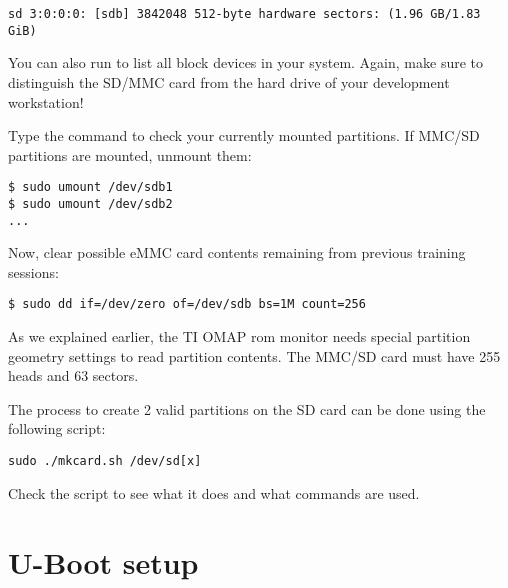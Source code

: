 \begin{verbatim}
sd 3:0:0:0: [sdb] 3842048 512-byte hardware sectors: (1.96 GB/1.83 GiB)
\end{verbatim}


You can also run  to list all block devices
in your system. Again, make sure to distinguish the SD/MMC card from the
hard drive of your development workstation!

Type the  command to check your currently mounted
partitions. If MMC/SD partitions are mounted, unmount them:

\begin{verbatim}
$ sudo umount /dev/sdb1
$ sudo umount /dev/sdb2
...
\end{verbatim}

Now, clear possible eMMC card contents remaining from previous training
sessions:

\begin{verbatim}
$ sudo dd if=/dev/zero of=/dev/sdb bs=1M count=256
\end{verbatim}

As we explained earlier, the TI OMAP rom monitor needs special partition geometry settings
to read partition contents. The MMC/SD card must have 255 heads and 63 sectors.

The process to create 2 valid partitions on the SD card can be done using the following script:
\begin{verbatim}
sudo ./mkcard.sh /dev/sd[x]
\end{verbatim}
Check the script to see what it does and what commands are used.


\section{U-Boot setup}

